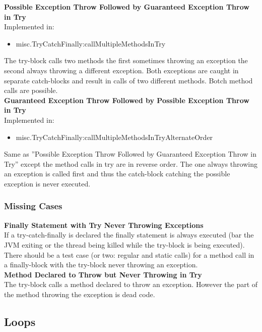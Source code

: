 \documentclass{article}
\begin{document}
\noindent
\textbf{Possible Exception Throw Followed by Guaranteed Exception Throw in Try}\\
Implemented in: 
\begin{itemize}
    \item misc.TryCatchFinally:callMultipleMethodsInTry
\end{itemize}
The try-block calls two methods the first sometimes throwing an exception the second always throwing a different exception. Both exceptions are caught in separate catch-blocks and result in calls of two different methods. Botch method calls are possible.\\

\noindent
\textbf{Guaranteed Exception Throw Followed by Possible Exception Throw in Try}\\
Implemented in: 
\begin{itemize}
    \item misc.TryCatchFinally:callMultipleMethodsInTryAlternateOrder
\end{itemize}
Same as ''Possible Exception Throw Followed by Guaranteed Exception Throw in Try'' except the method calls in try are in reverse order. The one always throwing an exception is called first and thus the catch-block catching the possible exception is never executed.\\

\subsubsection{Missing Cases}

\textbf{Finally Statement with Try Never Throwing Exceptions}\\
If a try-catch-finally is declared the finally statement is always executed (bar the JVM exiting or the thread being killed while the try-block is being executed). There should be a test case (or two: regular and static calls) for a method call in a finally-block with the try-block never throwing an exception.\\

\noindent
\textbf{Method Declared to Throw but Never Throwing in Try}\\
The try-block calls a method declared to throw an exception. However the part of the method throwing the exception is dead code.\\

\subsection{Loops}
\end{document}
